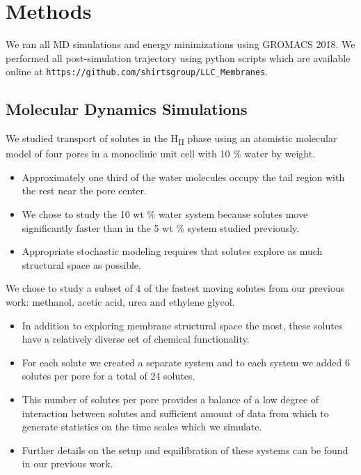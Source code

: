 \documentclass{article}
\begin{document}
  \section{Methods}
    
  We ran all MD simulations and energy minimizations using GROMACS 2018. We
  performed all post-simulation trajectory using python scripts which are available
  online at \texttt{https://github.com/shirtsgroup/LLC\_Membranes}.

  \subsection{Molecular Dynamics Simulations}

  We studied transport of solutes in the H\textsubscript{II} phase using an
  atomistic molecular model of four pores in a monoclinic unit cell with 
  10 \% water by weight. 
  \begin{itemize}
    \item Approximately one third of the water molecules occupy the tail region 
    with the rest near the pore center.
    \item We chose to study the 10 wt \% water system because solutes move 
    significantly faster than in the 5 wt \% system studied previously.
    \item Appropriate stochastic modeling requires that solutes explore 
    as much structural space as possible.  %
  \end{itemize}
  
  We chose to study a subset of 4 of the fastest moving solutes from our previous
  work: methanol, acetic acid, urea and ethylene glycol.
  \begin{itemize} 
    \item In addition to exploring membrane structural space the most, these solutes
    have a relatively diverse set of chemical functionality.   
    \item For each solute we created a separate system and to each system we
    added 6 solutes per pore for a total of 24 solutes.
    \item This number of solutes per pore provides a balance of a low 
    degree of interaction between solutes and sufficient amount of data from
    which to generate statistics on the time scales which we simulate.
    \item Further details on the setup and equilibration of these systems can
    be found in our previous work.\cite{coscia_chemically_2019}
  \end{itemize}
  
\end{document}
